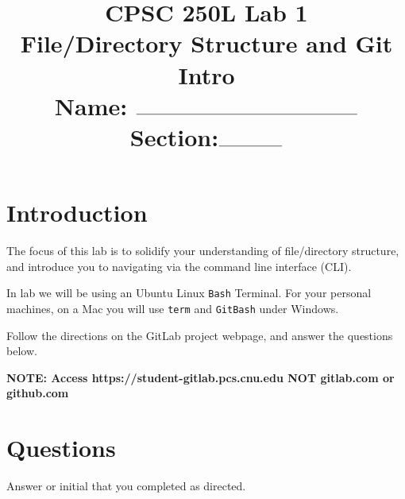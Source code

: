 \documentclass[notitlepage,12pt]{../../cpsc250l}
\title{CPSC 250L Lab 1\\[0.5em] File/Directory Structure and Git Intro\\[0.5em]Name: $\rule{7cm}{0.15mm}$  Section:$\rule{2cm}{0.15mm}$}
\begin{document}
\maketitle

\section{Introduction}

The focus of this lab is to solidify your understanding of file/directory structure, and
introduce you to navigating via the command line interface (CLI).

In lab we will be using an Ubuntu Linux \texttt{Bash} Terminal.
For your personal machines,  on a Mac you will use \texttt{term}
and \texttt{GitBash} under Windows.

Follow the directions on the GitLab project webpage, and answer the questions below.

{\bf NOTE: Access https://student-gitlab.pcs.cnu.edu  NOT gitlab.com or github.com}

\vspace{2in}

\section{Questions}

Answer or initial that you completed as directed.
\end{document}
